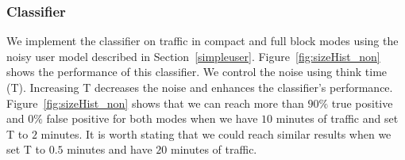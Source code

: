 \subsubsection{ Classifier}
We implement the  classifier on \bc traffic in compact and full block modes using the noisy user model described in Section~\ref{simpleuser}. Figure~\ref{fig:sizeHist_non} shows the performance of this classifier. We control the noise using think time (T). Increasing T decreases the noise and enhances the classifier's performance. Figure~\ref{fig:sizeHist_non} shows that we can reach more than $90\%$ true positive and $0\%$ false positive for both modes when we have $10$ minutes of traffic and set T to $2$ minutes. It is worth stating that we could reach similar results when we set T to $0.5$ minutes and have $20$ minutes of traffic.

 

